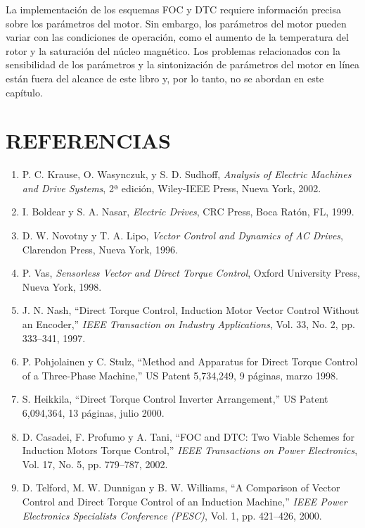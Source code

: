 \documentclass[letterpaper,12pt]{article}
\begin{document}
La implementación de los esquemas FOC y DTC requiere información precisa sobre los parámetros del motor. Sin embargo, los parámetros del motor pueden variar con las condiciones de operación, como el aumento de la temperatura del rotor y la saturación del núcleo magnético. Los problemas relacionados con la sensibilidad de los parámetros y la sintonización de parámetros del motor en línea están fuera del alcance de este libro y, por lo tanto, no se abordan en este capítulo.

\section*{REFERENCIAS}
\footnotesize
\begin{enumerate}
    \item P. C. Krause, O. Wasynczuk, y S. D. Sudhoff, \textit{Analysis of Electric Machines and Drive Systems}, 2ª edición, Wiley-IEEE Press, Nueva York, 2002.
    \item I. Boldear y S. A. Nasar, \textit{Electric Drives}, CRC Press, Boca Ratón, FL, 1999.
    \item D. W. Novotny y T. A. Lipo, \textit{Vector Control and Dynamics of AC Drives}, Clarendon Press, Nueva York, 1996.
    \item P. Vas, \textit{Sensorless Vector and Direct Torque Control}, Oxford University Press, Nueva York, 1998.
    \item J. N. Nash, ``Direct Torque Control, Induction Motor Vector Control Without an Encoder,'' \textit{IEEE Transaction on Industry Applications}, Vol. 33, No. 2, pp. 333--341, 1997.
    \item P. Pohjolainen y C. Stulz, ``Method and Apparatus for Direct Torque Control of a Three-Phase Machine,'' US Patent 5,734,249, 9 páginas, marzo 1998.
    \item S. Heikkila, ``Direct Torque Control Inverter Arrangement,'' US Patent 6,094,364, 13 páginas, julio 2000.
    \item D. Casadei, F. Profumo y A. Tani, ``FOC and DTC: Two Viable Schemes for Induction Motors Torque Control,'' \textit{IEEE Transactions on Power Electronics}, Vol. 17, No. 5, pp. 779--787, 2002.
    \item D. Telford, M. W. Dunnigan y B. W. Williams, ``A Comparison of Vector Control and Direct Torque Control of an Induction Machine,'' \textit{IEEE Power Electronics Specialists Conference (PESC)}, Vol. 1, pp. 421--426, 2000.
\end{enumerate}
\normalsize
\end{document}
